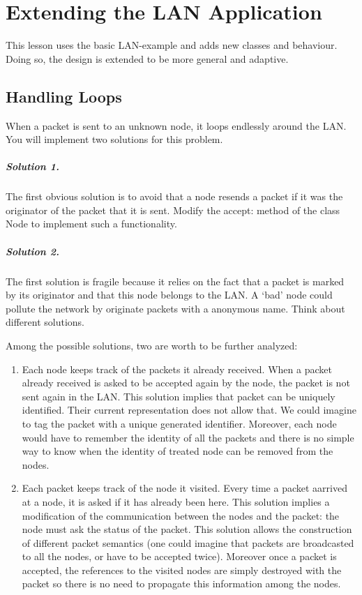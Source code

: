 \chapter{ Extending the LAN Application}


This lesson uses the basic LAN-example and adds new classes and 
behaviour. Doing so, the design is extended to be more general 
and adaptive.



\section{Handling Loops}


When a packet is sent to an unknown node, it loops endlessly 
around the LAN. You will implement two solutions for this problem. 

\paragraph{Solution 1.} The first obvious solution is to avoid that a node 
resends a packet if it was the originator of the packet that 
it is sent. Modify the accept: method of the class Node to implement 
such a functionality. 

\paragraph{Solution 2.} The first solution is fragile because it relies on 
the fact that a packet is marked by its originator and that this 
node belongs to the LAN. A `bad' node could pollute the network 
by originate packets with a anonymous name. Think about different 
solutions.

Among the possible solutions, two are worth to be further analyzed:
\begin{enumerate}
\item 
Each node keeps track of the packets it already received. When 
a packet already received is asked to be accepted again by the 
node, the packet is not sent again in the LAN. This solution 
implies that packet can be uniquely identified. Their current 
representation does not allow that. We could imagine to tag the 
packet with a unique generated identifier. Moreover, each node 
would have to remember the identity of all the packets and there 
is no simple way to know when the identity of treated node can 
be removed from the nodes.
\item 
Each packet keeps track of the node it visited. Every time a 
packet aarrived at a node, it is asked if it has already been 
here. This solution implies a modification of the communication 
between the nodes and the packet: the node must ask the status 
of the packet. This solution allows the construction of different 
packet semantics (one could imagine that packets are broadcasted 
to all the nodes, or have to be accepted twice). Moreover once 
a packet is accepted, the references to the visited nodes are 
simply destroyed with the packet so there is no need to propagate 
this information among the nodes. 
\end{enumerate}


